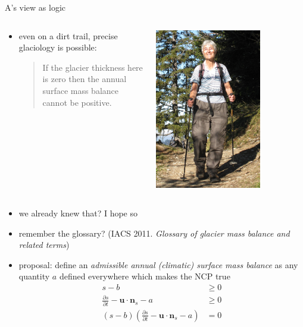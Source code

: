 \documentclass[10pt,hyperref,dvipsnames]{beamer}
\newcommand{\bn}{\mathbf{n}}
\newcommand{\bu}{\mathbf{u}}
\begin{document}
\begin{frame}{A's view as logic}

\begin{columns}
\begin{column}{0.8\textwidth}
\begin{itemize}
\item even on a dirt trail, precise glaciology is possible:

\bigskip
\begin{quote}
If the glacier thickness here is zero then the annual surface mass balance cannot be positive.
\end{quote}
\end{itemize}
\end{column}
\begin{column}{0.2\textwidth}
\hfill \includegraphics[width=0.7\textwidth]{figs/Iken_front_crop.jpg} \hfill
\end{column}
\end{columns}

\begin{itemize}
\item we already knew that?  I hope so
\item remember the glossary?  \quad \scriptsize (IACS 2011. \emph{Glossary of glacier mass balance and related terms}) \normalsize
\item proposal: define an \emph{admissible annual (climatic) surface mass balance} as any quantity $a$ defined everywhere which makes the NCP true
\begin{align*}
s-b &\ge 0 \\
\frac{\partial s}{\partial t} - \bu \cdot \bn_s - a &\ge 0 \\
(s-b) \left(\frac{\partial s}{\partial t} - \bu \cdot \bn_s - a\right) &= 0
\end{align*}


\end{itemize}
\end{frame}
\end{document}
